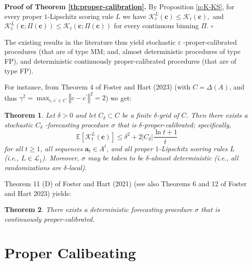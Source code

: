 \documentclass[12pt,a4paper,notitlepage]{article}
\newtheorem{theorem}{Theorem}
\newenvironment{proof}[1][Proof]{\noindent\textbf{#1.} }{\hfill $\square$}
\begin{document}
\bigskip

\begin{proof}[Proof of Theorem \protect\ref{th:proper-calibration}]
By Proposition \ref{p:K-KS}, for every proper $1$-Lipschitz scoring rule $L$
we have $\mathcal{K}_{t}^{L}(\mathbf{c})\leq \mathcal{K}_{t}(\mathbf{c}),$
and $\mathcal{K}_{t}^{L}(\mathbf{c};\Pi (\mathbf{c}))\leq \mathcal{K}_{t}(%
\mathbf{c};\Pi (\mathbf{c}))$ for every continuous binning $\Pi $.
\end{proof}

\bigskip

The existing results in the literature thus yield stochastic $\varepsilon $%
-proper-calibrated procedures (that are of type MM; and, almost
deterministic procedures of type FP), and deterministic continuously
proper-calibrated procedures (that are of type FP).

\bigskip

For instance, from Theorem 4 of Foster and Hart (2023) (with $C=\Delta (A)$,
and thus $\gamma ^{2}=\max_{c,c^{\prime }\in C}\left\Vert c-c^{\prime
}\right\Vert ^{2}=2$) we get:

\begin{theorem}
\label{th:calibration S}Let $\delta >0$ and let $C_{\delta }\subset C$ be a
finite $\delta $-grid of $C$. Then there exists a stochastic $C_{\delta }$%
-forecasting procedure $\sigma $ that is $\delta $-proper-calibrated;
specifically, 
\begin{equation*}
\mathbb{E}\left[ \mathcal{K}_{t}^{L}(\mathbf{c})\right] \leq \delta
^{2}+2|C_{\delta }|\frac{\ln t+1}{t}
\end{equation*}%
for all $t\geq 1$, all sequences $\mathbf{a}_{t}\in A^{t}$, and all proper $%
1 $-Lipschitz scoring rules $L$ (i.e., $L\in \mathcal{L}_{1}$). Moreover, $%
\sigma $ may be taken to be $\delta $-almost deterministic (i.e., all
randomizations are $\delta $-local).
\end{theorem}

\bigskip

Theorem 11 (D) of Foster and Hart (2021) (see also Theorems 6 and 12 of
Foster and Hart 2023) yields:

\begin{theorem}
\label{th:cont}There exists a \emph{deterministic} forecasting procedure $%
\sigma $ that is continuously proper-calibrated.
\end{theorem}

\section{Proper Calibeating\label{s:proper calibeating}}
\end{document}
